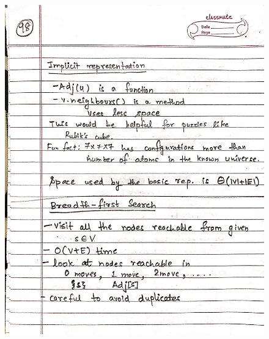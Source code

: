 \begin{figure}[H]
    \centering
    \includegraphics[scale=0.25]{"./MIT-6.006/MIT-6006-098"}
\end{figure}
\newpage

